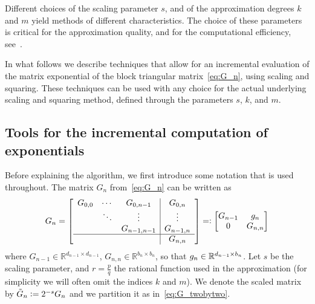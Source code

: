 Different choices of the scaling parameter $s$, and of the
approximation degrees $k$ and $m$ yield methods of different
characteristics. The choice of these parameters is critical for
the approximation quality, and for the computational efficiency,
see~\cite[chapter~10]{Higham2008}.

In what follows we describe techniques that allow for an incremental
evaluation of the matrix exponential of the block triangular
matrix~\eqref{eq:G_n}, using scaling and squaring.  These techniques
can be used with any choice for the actual underlying scaling and
squaring method, defined through the parameters $s$, $k$, and $m$.



\subsection{Tools for the incremental computation of exponentials}
\label{sec:tools}
Before explaining the algorithm, we first introduce some notation that
is used throughout.  The matrix $G_n$ from~\eqref{eq:G_n} can be written as
\begin{equation}
    \label{eq:G_twobytwo}
    G_n =
\left[
    \begin{array}{ccc|c}
        G_{0,0} &  \cdots &G_{0,n-1}& G_{0,n} \\
                &  \ddots & \vdots & \vdots  \\ 
                &   & G_{n-1,n-1}& G_{n-1,n} \\ \hline
                &         & & G_{n,n} \\
    \end{array}
\right]
    =\mathrel{\mathop:}
    \begin{bmatrix}
        G_{n-1} & g_n \\
        0       & G_{n,n}
    \end{bmatrix}
\end{equation}
where $G_{n-1} \in \mathbb{R}^{d_{n-1} \times d_{n-1}}$, $G_{n,n}\in
\mathbb{R}^{b_n \times b_n}$, so that $g_n \in {\mathbb R}^{d_{n-1} \times
b_n}$.  Let $s$ be the scaling parameter, and $r = \frac{p}{q}$ the
rational function used in the approximation (for simplicity we will often omit the indices $k$ and $m$).  We denote the scaled
matrix by $\tilde{G}_n \mathrel{\mathop:}= 2^{-s} G_n$ and we partition it as
in~\eqref{eq:G_twobytwo}.\

